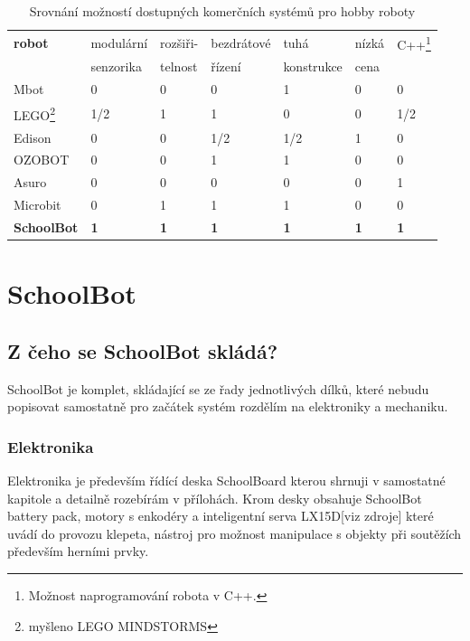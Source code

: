 \documentclass{template/socthesis}
\begin{document}
\begin{table}[h]
	\centering
	\begin{tabular}{|l|l|l|l|l|l|l|}
		\hline
		\textbf{robot }			& modulární   & rozšiři- & bezdrátové  & tuhá  & nízká & C++\footnote{Možnost naprogramování robota v C++.} \\
		 & senzorika & telnost & řízení & konstrukce & cena &  \\
		 \hline
		Mbot 			& 0 				& 0 			& 0 			& 1 			& 0			& 0	\\ 
		LEGO\footnote{myšleno LEGO MINDSTORMS} 	& 1/2 				& 1 			& 1 			& 0 			& 0			& 1/2	\\ 
		Edison 			& 0 				& 0 			& 1/2 			& 1/2 			& 1			& 0	\\ 
		OZOBOT			& 0					& 0				& 1 			& 1				& 0			& 0	\\
		Asuro			& 0					& 0				& 0 			& 0				& 0			& 1	\\
		Microbit		& 0					& 1				& 1 			& 1				& 0			& 0	\\
			\textbf{SchoolBot} 		& \textbf{1} 				& \textbf{1} 			& \textbf{1} 			& \textbf{1} 			& \textbf{1} 		& \textbf{1}	\\ 
		\hline
	\end{tabular}
	\caption{Srovnání možností dostupných komerčních systémů pro hobby roboty}
\end{table}

\chapter{SchoolBot}

\section{Z čeho se SchoolBot skládá?}
SchoolBot je komplet, skládající se ze řady jednotlivých dílků, které nebudu popisovat samostatně pro začátek systém rozdělím na elektroniky a mechaniku.

\subsection{Elektronika}

Elektronika je především řídící deska SchoolBoard kterou shrnuji v samostatné kapitole a detailně rozebírám v přílohách. Krom desky obsahuje SchoolBot battery pack, motory s enkodéry a inteligentní serva LX15D[viz zdroje] které uvádí do provozu klepeta, nástroj pro možnost manipulace s objekty při soutěžích především herními prvky.
\end{document}
